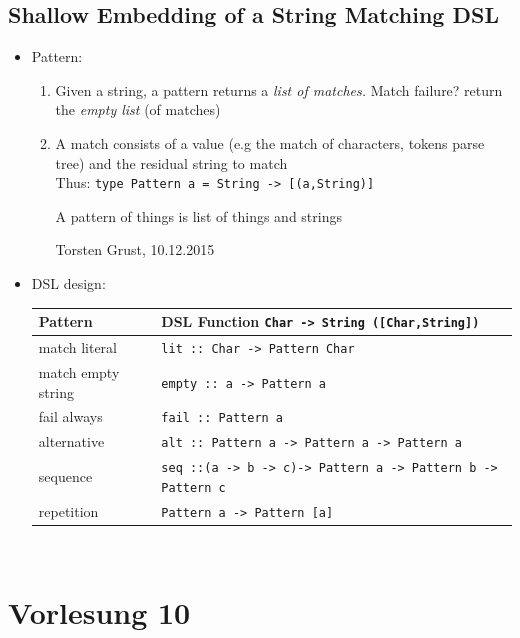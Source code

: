 \documentclass{article}
\newcommand{\Haskell}[1]{\texttt{#1}}
\begin{document}
\subsection{Shallow Embedding of a String Matching DSL}
\begin{itemize}
\item Pattern:
\begin{enumerate}[1.]
\item Given a string, a pattern returns a \emph{list of matches.} Match failure? return the \emph{empty list} (of matches)
\item A match consists of a value (e.g the match of characters, tokens parse tree) and the residual string to match\\
Thus: \Haskell{type Pattern a = String -> [(a,String)]}
\epigraph{A pattern of things is list of things and strings}{Torsten Grust, 10.12.2015}
\end{enumerate} 
\item DSL design:\\
\begin{tabular}{l|l}
Pattern& DSL Function \Haskell{Char -> String ([Char,String])}\\ \hline
match literal& \Haskell{lit :: Char -> Pattern Char}\\
match empty string& \Haskell{empty :: a -> Pattern a}\\
fail always & \Haskell{fail :: Pattern a}\\
alternative &\Haskell{alt :: Pattern a -> Pattern a -> Pattern a}\\
sequence &\Haskell{seq ::(a ->  b -> c)-> Pattern a -> Pattern b -> Pattern c}\\
repetition & \Haskell{Pattern a -> Pattern [a]}
\end{tabular}
\end{itemize}
\begin{listing}
\inputminted{Haskell}{PatternMatching.hs}
\end{listing}
\begin{listing}
\inputminted{Haskell}{pattern-match.hs}
\end{listing}
\clearpage
\section{Vorlesung 10}
\end{document}
